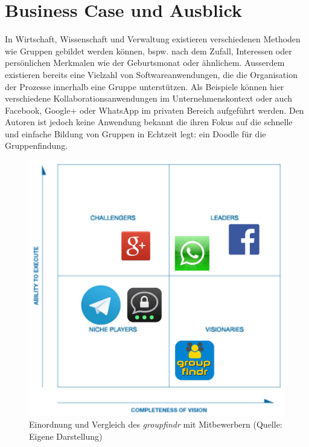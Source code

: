 \chapter{Business Case und Ausblick}
\label{business_case}

In Wirtschaft, Wissenschaft und Verwaltung existieren verschiedenen Methoden wie Gruppen gebildet werden können, bspw. nach dem Zufall, Interessen oder persönlichen Merkmalen wie der Geburtsmonat oder ähnlichem. Ausserdem existieren bereits eine Vielzahl von Softwareanwendungen, die die Organisation der Prozesse innerhalb eine Gruppe unterstützen. Als Beispiele können hier verschiedene Kollaborationsanwendungen im Unternehmenskontext oder auch Facebook, Google+ oder WhatsApp im privaten Bereich aufgeführt werden. Den Autoren ist jedoch keine Anwendung bekannt die ihren Fokus auf die schnelle und einfache Bildung von Gruppen in Echtzeit legt: ein Doodle für die Gruppenfindung. 

\begin{figure}[h]
\centering
\includegraphics[width=0.5\linewidth]{graphiken/magic_quadrant.png}%
\caption{Einordnung und Vergleich des \emph{groupfindr} mit Mitbewerbern (Quelle: Eigene Darstellung)}%
\label{magic_quadrant}%
\end{figure}

